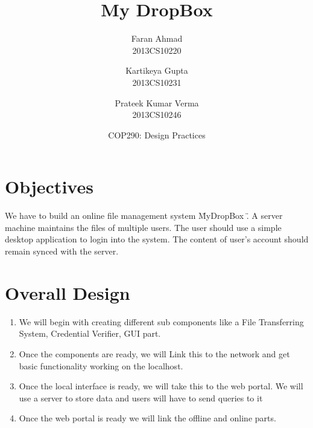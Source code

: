 \documentclass{article}
\title{\vspace*{\fill} My DropBox}
\author{
	Faran Ahmad\\
	2013CS10220
	\and
	Kartikeya Gupta\\ 
	2013CS10231
	\and
	Prateek Kumar Verma\\ 
	2013CS10246
}
\date{COP290: Design Practices \vspace*{\fill}}
\begin{document}
	\maketitle

	\newpage

	\section{Objectives}
	We have to build an online file management system \" MyDropBox \". A server machine maintains the files of multiple users. The user should use a simple desktop application to login into the system. The content of user's account should remain synced with the server. 

	\section{Overall Design}
		\begin{enumerate}
			\item We will begin with creating different sub components like a File Transferring System, Credential Verifier, GUI part.
			\item Once the components are ready, we will Link this to the network and get basic functionality working on the localhost.
			\item Once the local interface is ready, we will take this to the web portal. We will use a server to store data and users will have to send queries to it
			\item Once the web portal is ready we will link the offline and online parts.
		\end{enumerate}
\end{document}
